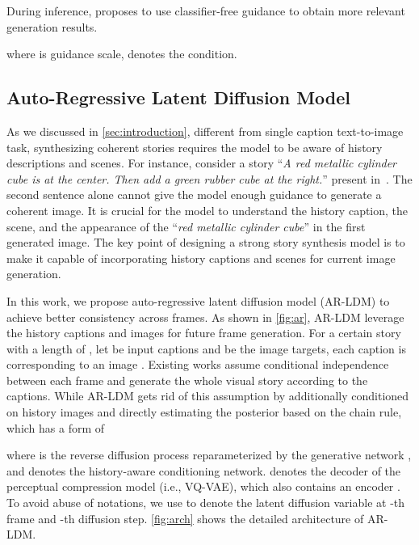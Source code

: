 \documentclass[10pt,twocolumn,letterpaper]{article}
\begin{document}
During inference, \cite{classifierfree} proposes to use classifier-free guidance to obtain more relevant generation results.

where  is guidance scale,  denotes the condition.


\subsection{Auto-Regressive Latent Diffusion Model}
As we discussed in \cref{sec:introduction}, different from single caption text-to-image task, synthesizing coherent stories requires the model to be aware of history descriptions and scenes. For instance, consider a story ``\textit{A red metallic cylinder cube is at the center. Then add a green rubber cube at the right.}'' present in~\cite{storygan}. The second sentence alone cannot give the model enough guidance to generate a coherent image. It is crucial for the model to understand the history caption, the scene, and the appearance of the ``\textit{red metallic cylinder cube}'' in the first generated image. The key point of designing a strong story synthesis model is to make it capable of incorporating history captions and scenes for current image generation.

In this work, we propose auto-regressive latent diffusion model (AR-LDM) to achieve better consistency across frames. As shown in \cref{fig:ar}, AR-LDM leverage the history captions and images for future frame generation. For a certain story with a length of , let  be input captions and  be the image targets, each caption  is corresponding to an image . Existing works assume conditional independence between each frame and generate the whole visual story according to the captions. While AR-LDM gets rid of this assumption by additionally conditioned on history images  and directly estimating the posterior based on the chain rule, which has a form of


where  is the reverse diffusion process reparameterized by the generative network , and  denotes the history-aware conditioning network.  denotes the decoder of the perceptual compression model (i.e., VQ-VAE), which also contains an encoder . To avoid abuse of notations, we use  to denote the latent diffusion variable at -th frame and -th diffusion step. \cref{fig:arch} shows the detailed architecture of AR-LDM.
\end{document}
